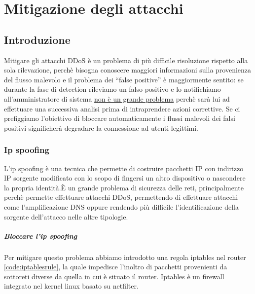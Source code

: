 \chapter{Mitigazione degli attacchi}


\section{Introduzione}

Mitigare gli attacchi DDoS è un problema di più difficile risoluzione rispetto alla sola rilevazione, perchè bisogna conoscere maggiori informazioni sulla provenienza del flusso malevolo e il problema dei ``false positive'' è maggiormente sentito: se durante la fase di detection rileviamo un falso positivo e lo notifichiamo all'amministratore di sistema \underline{non è un grande problema} perchè sarà lui ad effettuare una successiva analisi prima di intraprendere azioni correttive. Se ci prefiggiamo l'obiettivo di bloccare automaticamente i flussi malevoli dei falsi positivi significherà degradare la connessione ad utenti legittimi.

\subsection{Ip spoofing}

L'ip spoofing è una tecnica che permette di costruire pacchetti IP con indirizzo IP sorgente modificato con lo scopo di fingersi un altro dispositivo o nascondere la propria identità.È un grande problema di sicurezza delle reti, principalmente perchè permette effettuare attacchi DDoS, permettendo di effettuare attacchi come l'amplificazione DNS oppure rendendo più difficile l'identificazione della sorgente dell'attacco nelle altre tipologie.



\paragraph{Bloccare l'ip spoofing}
Per mitigare questo problema abbiamo introdotto una regola iptables nel router \ref{code:iptablesrule}, la quale impedisce l'inoltro di pacchetti provenienti da sottoreti diverse da quella in cui è situato il router.
Iptables è un firewall integrato nel kernel linux basato su netfilter.

